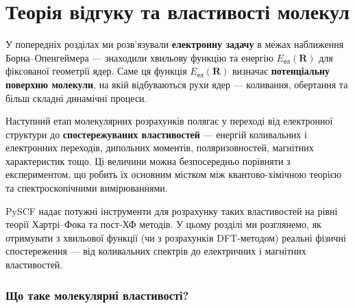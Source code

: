 
\chapter{Теорія відгуку та властивості молекул}\label{\currfilebase}

У попередніх розділах ми розв’язували \textbf{електронну задачу}
в межах наближення Борна–Опенгеймера --- знаходили хвильову функцію
та енергію $E_\text{ел}(\mathbf{R})$ для фіксованої геометрії ядер.
Саме ця функція $E_\text{ел}(\mathbf{R})$ визначає
\textbf{потенціальну поверхню молекули}, на якій відбуваються
рухи ядер --- коливання, обертання та більш складні динамічні процеси.

Наступний етап молекулярних розрахунків полягає у переході
від електронної структури до \textbf{спостережуваних властивостей} ---
енергій коливальних і електронних переходів, дипольних моментів,
поляризовностей, магнітних характеристик тощо.
Ці величини можна безпосередньо порівняти з експериментом,
що робить їх основним містком між квантово-хімічною теорією
та спектроскопічними вимірюваннями.

PySCF надає потужні інструменти для розрахунку таких властивостей
на рівні теорії Хартрі–Фока та пост-ХФ методів.
У цьому розділі ми розглянемо, як отримувати з хвильової функції (чи з розрахунків DFT-методом)
реальні фізичні спостереження --- від коливальних спектрів
до електричних і магнітних властивостей.

%
%

\subsection{Що таке молекулярні властивості?}

